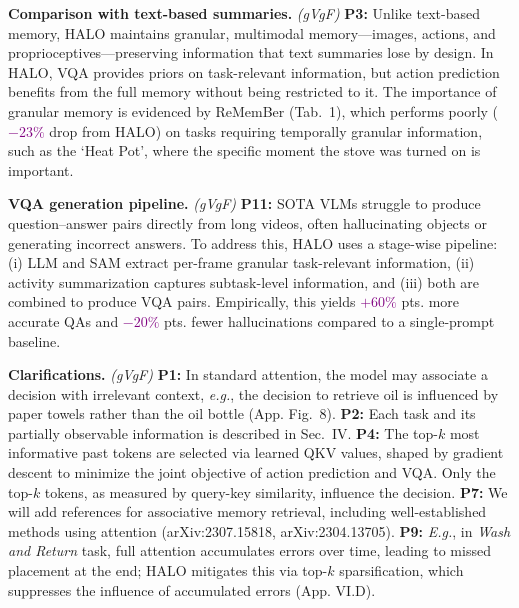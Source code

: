 \documentclass[conference]{IEEEtran}
\newcommand{\hlt}[1]{\textcolor{purple}{#1}}
\begin{document}
\noindent
\textbf{Comparison with text-based summaries.} \textit{(gVgF)} \textbf{P3:}
Unlike text-based memory, HALO maintains granular, multimodal memory---images, actions, and proprioceptives---preserving information that text summaries lose by design. In HALO, VQA provides priors on task-relevant information, but action prediction benefits from the full memory without being restricted to it.
The importance of granular memory is evidenced by ReMemBer (Tab.~1), which performs poorly (\hlt{$-23\%$} drop from HALO) on tasks requiring temporally granular information, such as the `Heat Pot', where the specific moment the stove was turned on is important.
 
\noindent
\textbf{VQA generation pipeline.} \textit{(gVgF)} \textbf{P11:}
SOTA VLMs struggle to produce question--answer pairs directly from long videos, often hallucinating objects or generating incorrect answers. To address this, HALO uses a stage-wise pipeline: (i) LLM and SAM extract per-frame granular task-relevant information, (ii) activity summarization captures subtask-level information, and (iii) both are combined to produce VQA pairs. Empirically, this yields \hlt{$+60\%$} pts. more accurate QAs and \hlt{$-20\%$} pts. fewer hallucinations compared to a single-prompt baseline.


\noindent
\textbf{Clarifications.} \textit{(gVgF)}
\textbf{P1:} In standard attention, the model may associate a decision with irrelevant context, \textit{e.g.}, the decision to retrieve oil is influenced by paper towels rather than the oil bottle (App. Fig.~8).
\textbf{P2:} Each task and its partially observable information is described in Sec.~IV.
\textbf{P4:} The top-$k$ most informative past tokens are selected via learned QKV values, shaped by gradient descent to minimize the joint objective of action prediction and VQA. Only the top-$k$ tokens, as measured by query-key similarity, influence the decision.
\textbf{P7:} We will add references for associative memory retrieval, including well-established methods using attention (arXiv:2307.15818, arXiv:2304.13705).
\textbf{P9:} \textit{E.g.}, in \textit{Wash and Return} task, full attention accumulates errors over time, leading to missed placement at the end; HALO mitigates this via top-$k$ sparsification, which suppresses the influence of accumulated errors (App. VI.D).
\end{document}
